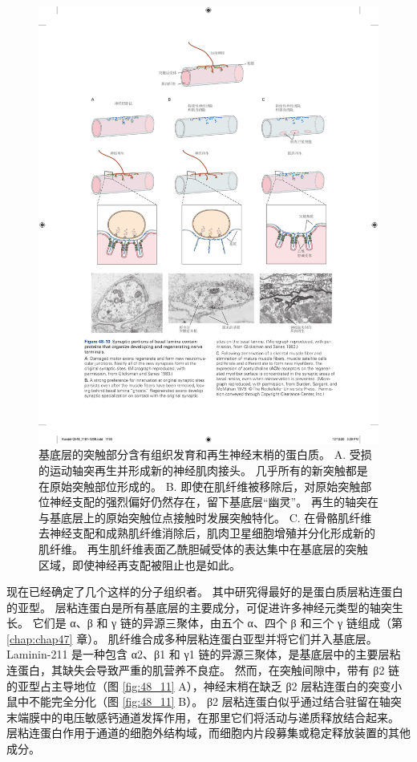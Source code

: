 \begin{figure}[htbp]
	\centering
	\includegraphics[width=0.9\linewidth]{chap48/fig_48_10}
	\caption{基底层的突触部分含有组织发育和再生神经末梢的蛋白质。
		A. 受损的运动轴突再生并形成新的神经肌肉接头。
		几乎所有的新突触都是在原始突触部位形成的\cite{glicksman1983differentiation}。
		B. 即使在肌纤维被移除后，对原始突触部位神经支配的强烈偏好仍然存在，留下基底层“幽灵”。 
		再生的轴突在与基底层上的原始突触位点接触时发展突触特化\cite{glicksman1983differentiation}。
		C. 在骨骼肌纤维去神经支配和成熟肌纤维消除后，肌肉卫星细胞增殖并分化形成新的肌纤维。
		再生肌纤维表面乙酰胆碱受体的表达集中在基底层的突触区域，即使神经再支配被阻止也是如此\cite{burden1979acetylcholine}。}
	\label{fig:48_10}
\end{figure}


现在已经确定了几个这样的分子组织者。
其中研究得最好的是蛋白质层粘连蛋白的亚型。
层粘连蛋白是所有基底层的主要成分，可促进许多神经元类型的轴突生长。
它们是 α、β 和 γ 链的异源三聚体，由五个 α、四个 β 和三个 γ 链组成（第 \ref{chap:chap47} 章）。
肌纤维合成多种层粘连蛋白亚型并将它们并入基底层。
Laminin-211 是一种包含 α2、β1 和 γ1 链的异源三聚体，是基底层中的主要层粘连蛋白，其缺失会导致严重的肌营养不良症。
然而，在突触间隙中，带有 β2 链的亚型占主导地位（图 \ref{fig:48_11} A），神经末梢在缺乏 β2 层粘连蛋白的突变小鼠中不能完全分化（图 \ref{fig:48_11} B）。 
β2 层粘连蛋白似乎通过结合驻留在轴突末端膜中的电压敏感钙通道发挥作用，在那里它们将活动与递质释放结合起来。 层粘连蛋白作用于通道的细胞外结构域，而细胞内片段募集或稳定释放装置的其他成分。

